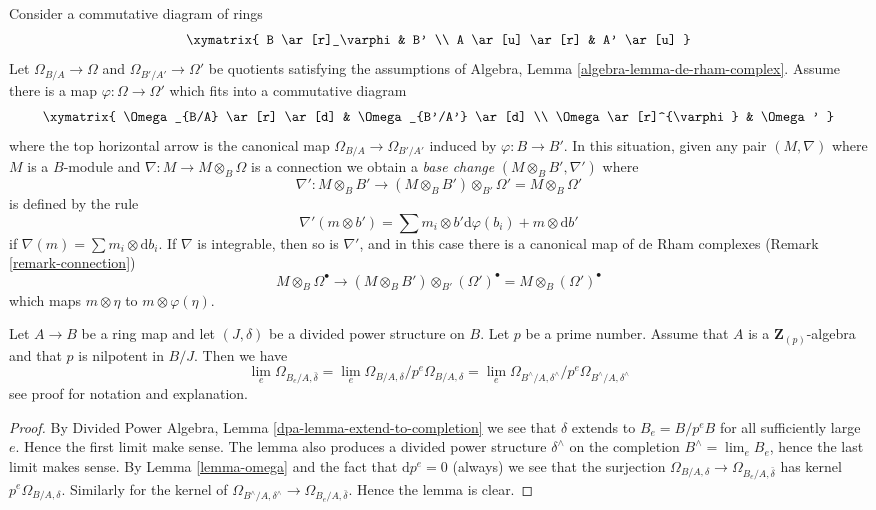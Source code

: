 \begin{remark}
\label{remark-base-change-connection}
Consider a commutative diagram of rings
$$
\xymatrix{
B \ar[r]_\varphi & B' \\
A \ar[u] \ar[r] & A' \ar[u]
}
$$
Let $\Omega_{B/A} \to \Omega$ and $\Omega_{B'/A'} \to \Omega'$
be quotients satisfying the assumptions of
Algebra, Lemma \ref{algebra-lemma-de-rham-complex}.
Assume there is a map $\varphi : \Omega \to \Omega'$ which
fits into a commutative diagram
$$
\xymatrix{
\Omega_{B/A} \ar[r] \ar[d] &
\Omega_{B'/A'} \ar[d] \\
\Omega \ar[r]^{\varphi} &
\Omega'
}
$$
where the top horizontal arrow is the canonical map
$\Omega_{B/A} \to \Omega_{B'/A'}$ induced by $\varphi : B \to B'$.
In this situation, given any pair $(M, \nabla)$ where $M$ is a $B$-module
and $\nabla : M \to M \otimes_B \Omega$ is a connection
we obtain a {\it base change} $(M \otimes_B B', \nabla')$ where
$$
\nabla' :
M \otimes_B B'
\longrightarrow
(M \otimes_B B') \otimes_{B'} \Omega' = M \otimes_B \Omega'
$$
is defined by the rule
$$
\nabla'(m \otimes b') =
\sum m_i \otimes b'\text{d}\varphi(b_i) + m \otimes \text{d}b' 
$$
if $\nabla(m) = \sum m_i \otimes \text{d}b_i$. If $\nabla$ is integrable,
then so is $\nabla'$, and in this case there is a canonical map of
de Rham complexes (Remark \ref{remark-connection})
\begin{equation}
\label{equation-base-change-map-complexes}
M \otimes_B \Omega^\bullet
\longrightarrow
(M \otimes_B B') \otimes_{B'} (\Omega')^\bullet =
M \otimes_B (\Omega')^\bullet
\end{equation}
which maps $m \otimes \eta$ to $m \otimes \varphi(\eta)$.
\end{remark}

\begin{lemma}
\label{lemma-differentials-completion}
Let $A \to B$ be a ring map and let $(J, \delta)$ be a divided power
structure on $B$. Let $p$ be a prime number. Assume that $A$ is a
$\mathbf{Z}_{(p)}$-algebra and that $p$ is nilpotent in $B/J$. Then
we have
$$
\lim_e \Omega_{B_e/A, \bar\delta} =
\lim_e \Omega_{B/A, \delta}/p^e\Omega_{B/A, \delta} =
\lim_e \Omega_{B^\wedge/A, \delta^\wedge}/p^e \Omega_{B^\wedge/A, \delta^\wedge}
$$
see proof for notation and explanation.
\end{lemma}

\begin{proof}
By Divided Power Algebra, Lemma \ref{dpa-lemma-extend-to-completion}
we see that $\delta$ extends
to $B_e = B/p^eB$ for all sufficiently large $e$. Hence the first limit
make sense. The lemma also produces a divided power structure $\delta^\wedge$
on the completion $B^\wedge = \lim_e B_e$, hence the last limit makes
sense. By Lemma \ref{lemma-omega}
and the fact that $\text{d}p^e = 0$ (always)
we see that the surjection
$\Omega_{B/A, \delta} \to \Omega_{B_e/A, \bar\delta}$ has kernel
$p^e\Omega_{B/A, \delta}$. Similarly for the kernel of 
$\Omega_{B^\wedge/A, \delta^\wedge} \to \Omega_{B_e/A, \bar\delta}$.
Hence the lemma is clear.
\end{proof}



